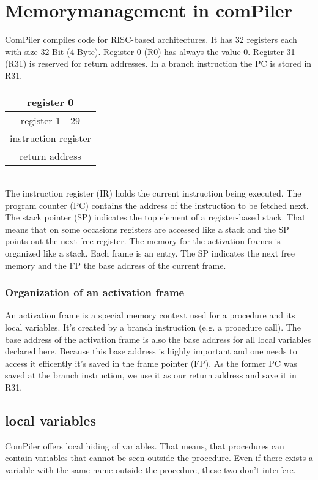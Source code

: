 \section{Memorymanagement in comPiler}
ComPiler compiles code for RISC-based architectures. It has 32 registers each
with size 32 Bit (4 Byte). Register 0 (R0) has always the value 0. Register 31
(R31) is reserved for return addresses. In a branch instruction the PC is stored
in R31. \\
 
\begin{tabular}{|c|}
\hline
register 0 \\
\hline 
register 1 - 29 \\
\hline
instruction register \\
\hline
return address \\
\hline 
\end{tabular}
\\
The instruction register (IR) holds the current instruction being executed. \newline 
The program counter (PC) contains the address of the instruction to be
fetched next. \newline
The stack pointer (SP) indicates the top element of a register-based stack. That
means that on some occasions registers are accessed like a stack and the SP
points out the next free register.  
\newline
The memory for the activation frames is organized like a stack. Each frame is an
entry. The SP indicates the next free memory and the FP the base address of the
current frame. 
\subsubsection{Organization of an activation frame}
An activation frame is a special memory context used for a procedure and its
local variables. It's created by a branch instruction (e.g. a procedure call). The base address of the activation 
frame is also the base address for all local variables declared here. Because this base address is highly 
important and one needs to access it efficently it's saved in the frame pointer (FP).
As the former PC was saved at the branch instruction, we use it as our return
address and save it in R31.



\subsection{local variables}
ComPiler offers local hiding of variables. That means, that procedures can
contain variables that cannot be seen outside the procedure. Even if there
exists a variable with the same name outside the procedure, these two don't
interfere. 

